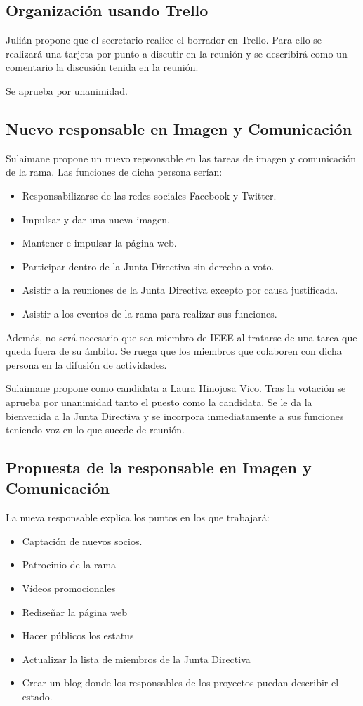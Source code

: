 \documentclass[12pt,twoside,openany,a4paper]{book}
\begin{document}
    \subsection{ Organización usando Trello}
    Julián propone que el secretario realice el borrador en Trello. Para ello se realizará una tarjeta por punto a discutir en la reunión y se describirá como un comentario la discusión tenida en la reunión.

    Se aprueba por unanimidad.

    \subsection{Nuevo responsable en Imagen y Comunicación}
    Sulaimane propone un nuevo repsonsable en las tareas de imagen y comunicación de la rama. Las funciones de dicha persona serían:
    \begin{itemize}
        \item Responsabilizarse de las redes sociales Facebook y Twitter.
        \item Impulsar y dar una nueva imagen.
        \item Mantener e impulsar la página web.
        \item Participar dentro de la Junta Directiva sin derecho a voto.
        \item Asistir a la reuniones de la Junta Directiva excepto por causa justificada.
        \item Asistir a los eventos de la rama para realizar sus funciones.
    \end{itemize}

    Además, no será necesario que sea miembro de IEEE al tratarse de una tarea que queda fuera de su ámbito. Se ruega que los miembros que colaboren con dicha persona en la difusión de actividades.

    Sulaimane propone como candidata a Laura Hinojosa Vico. Tras la votación se aprueba por unanimidad tanto el puesto como la candidata. Se le da la bienvenida a la Junta Directiva y se incorpora inmediatamente a sus funciones teniendo voz en lo que sucede de reunión.

    \subsection{Propuesta de la responsable en Imagen y Comunicación}
    La nueva responsable explica los puntos en los que trabajará:
    \begin{itemize}
        \item Captación de nuevos socios.
        \item Patrocinio de la rama
        \item Vídeos promocionales
        \item Rediseñar la página web
        \item Hacer públicos los estatus
        \item Actualizar la lista de miembros de la Junta Directiva
        \item Crear un blog donde los responsables de los proyectos puedan describir el estado.
    \end{itemize}
\end{document}
